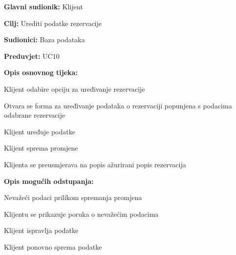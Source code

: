 \noindent {}
\begin{packed_item}
	
	\item \textbf{Glavni sudionik:} Klijent
	\item  \textbf{Cilj:} Urediti podatke rezervacije
	\item  \textbf{Sudionici:} Baza podataka
	\item  \textbf{Preduvjet:} UC10
	\item  \textbf{Opis osnovnog tijeka:}
	
	\item[] \begin{packed_enum}
		
		\item Klijent odabire opciju za uređivanje rezervacije
		\item Otvara se forma za uređivanje podataka o rezervaciji popunjena s podacima odabrane rezervacije
		\item Klijent uređuje podatke
		\item Klijent sprema promjene
		\item Klijenta se preusmjerava na popis ažurirani popis rezervacija
		
	\end{packed_enum}
	\item  \textbf{Opis mogućih odstupanja:}
	\item[] \begin{packed_item}
		
		\item[3.a] Nevažeći podaci prilikom spremanja promjena
		\item[] \begin{packed_enum}
			
			\item Klijentu se prikazuje poruka o nevažećim podacima
			\item Klijent ispravlja podatke
			\item Klijent ponovno sprema podatke
			
		\end{packed_enum}
		
	\end{packed_item}
		
\end{packed_item}

